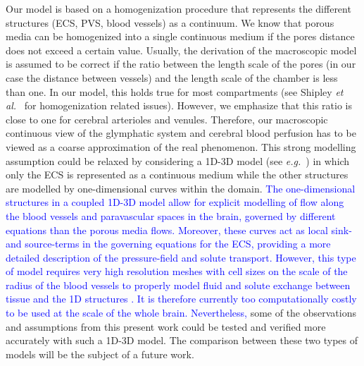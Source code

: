 \documentclass[10pt]{article}
\newcommand{\eg}{\emph{e.g.}\;}
\newcommand{\etal}{\emph{et al.}\;}
\newcommand{\1}{^{(1)}}
\newcommand{\2}{^{(2)}}
\newcommand{\corr}[1]{\textcolor{blue}{#1}}
\begin{document}
Our model is based on a homogenization procedure that represents the different structures (ECS, PVS, blood vessels) as a continuum. We know that porous media can be homogenized into a single continuous medium if the pores distance does not exceed a certain value. Usually, the derivation of the macroscopic model is assumed to be correct if the ratio between the length scale of the pores (in our case the distance between vessels) and the length scale of the chamber is less than one. In our model, this holds true for most compartments (see Shipley \etal~\cite{shipley-four-comp} for homogenization related issues). However, we emphasize that this ratio is close to one for cerebral arterioles and venules. Therefore, our macroscopic continuous view of the glymphatic system and cerebral blood perfusion has to be viewed as a coarse approximation of the real phenomenon. This strong modelling assumption could be relaxed by considering a 1D-3D model (see \eg~\cite{d2008coupling}) in which only the ECS is represented as a continuous medium while the other structures are modelled by one-dimensional curves within the domain. 
\corr{%
The one-dimensional structures in a coupled 1D-3D model allow for explicit modelling of flow along the blood vessels and paravascular spaces in the brain, governed by different equations than the porous media flows. Moreover, these curves act as local sink- and source-terms in the governing equations for the ECS, providing a more detailed description of the pressure-field and solute transport. However, this type of model requires very high resolution meshes with cell sizes on the scale of the radius of the blood vessels to properly model fluid and solute exchange between tissue and the 1D structures \cite{gjerde2020singularity}. It is therefore currently too computationally costly to be used at the scale of the whole brain. Nevertheless,} some of the observations and assumptions from this present work could be tested and verified more accurately with such a 1D-3D model. The comparison between these two types of models will be the subject of a future work.
\end{document}
